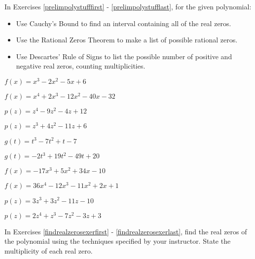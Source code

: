 \startexenum

In Exercises \ref{prelimpolystufffirst} - \ref{prelimpolystufflast}, for the given polynomial:

\begin{itemize}
\item  Use Cauchy's Bound to find an interval containing all of the real zeros.
\item  Use the Rational Zeros Theorem to make a list of possible rational zeros.
\item  Use Descartes' Rule of Signs to list the possible number of positive and negative real zeros, counting multiplicities.
\end{itemize}


\begin{shortexenum}[$f(x) = x^{4} + 2x^{3} - 12x^{2} - 40x - 32$
]
\item $f(x) = x^{3} - 2x^{2} - 5x + 6$ \label{prelimpolystufffirst}
\item $f(x) = x^{4} + 2x^{3} - 12x^{2} - 40x - 32$
\item $p(z) = z^{4} - 9z^{2} - 4z + 12$
\item $p(z) = z^{3} + 4z^{2} - 11z + 6$
\item $g(t) = t^{3} - 7t^{2} + t - 7$
\item $g(t) = -2t^{3} + 19t^{2} - 49t + 20$
\item $f(x) = -17x^{3} + 5x^{2} + 34x - 10$
\item $f(x) = 36x^{4} - 12x^{3} - 11x^{2} + 2x + 1$
\item $p(z) = 3z^{3} + 3z^{2} - 11z - 10$
\item $p(z) = 2z^4+z^3-7z^2-3z+3$ \label{prelimpolystufflast}
\end{shortexenum}


In Exercises \ref{findrealzerosexerfirst} - \ref{findrealzerosexerlast}, find the real zeros of the polynomial using the techniques specified by your instructor.  State the multiplicity of each real zero.

